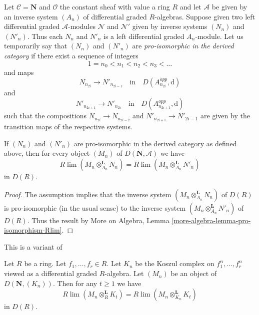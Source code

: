 \noindent
Let $\mathcal{C} = \mathbf{N}$ and $\mathcal{O}$ the constant sheaf
with value a ring $R$ and let $\mathcal{A}$ be given by an inverse
system $(A_n)$ of differential graded $R$-algebras. Suppose given two
left differential graded $\mathcal{A}$-modules $\mathcal{N}$ and
$\mathcal{N}'$ given by inverse systems $(N_n)$ and $(N'_n)$.
Thus each $N_n$ and $N'_n$ is a left differential graded $A_n$-module.
Let us temporarily say that $(N_n)$ and $(N'_n)$ are
{\it pro-isomorphic in the derived category}
if there exist a sequence of integers
$$
1 = n_0 < n_1 < n_2 < n_3 < \ldots
$$
and maps
$$
N_{n_{2i}} \to N'_{n_{2i - 1}}
\quad\text{in}\quad
D(A_{n_{2i}}^{opp}, \text{d})
$$
and
$$
N'_{n_{2i + 1}} \to N'_{n_{2i}}
\quad\text{in}\quad
D(A_{n_{2i + 1}}^{opp}, \text{d})
$$
such that the compositions $N_{n_{2i}} \to N_{n_{2i - 2}}$
and $N'_{n_{2i + 1}} \to N'_{2i - 1}$ are given by the transition
maps of the respective systems.

\begin{lemma}
\label{lemma-pro-isomorphic-systems-tensor}
If $(N_n)$ and $(N'_n)$ are pro-isomorphic in the derived category
as defined above,
then for every object $(M_n)$ of $D(\mathbf{N}, \mathcal{A})$ we have
$$
R\lim (M_n \otimes_{A_n}^\mathbf{L} N_n) =
R\lim (M_n \otimes_{A_n}^\mathbf{L} N'_n)
$$
in $D(R)$.
\end{lemma}

\begin{proof}
The assumption implies that the inverse system
$(M_n \otimes_{A_n}^\mathbf{L} N_n)$ of $D(R)$ is pro-isomorphic
(in the usual sense) to the inverse system
$(M_n \otimes_{A_n}^\mathbf{L} N'_n)$ of $D(R)$.
Thus the result by
More on Algebra, Lemma \ref{more-algebra-lemma-pro-isomorphism-Rlim}.
\end{proof}

\begin{lemma}
\label{lemma-different-tensors}
\begin{reference}
This is a variant of \cite[Lemma 3.5.4]{BS}
\end{reference}
Let $R$ be a ring. Let $f_1, \ldots, f_r \in R$.
Let $K_n$ be the Koszul complex on $f_1^n, \ldots, f_r^n$
viewed as a differential graded $R$-algebra.
Let $(M_n)$ be an object of $D(\mathbf{N}, (K_n))$.
Then for any $t \geq 1$ we have
$$
R\lim (M_n \otimes_R^\mathbf{L} K_t) =
R\lim (M_n \otimes_{K_n}^\mathbf{L} K_t)
$$
in $D(R)$.
\end{lemma}


